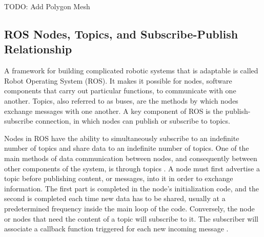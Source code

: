 TODO: Add Polygon Mesh

\subsection{ROS Nodes, Topics, and Subscribe-Publish Relationship}
A framework for building complicated robotic systems that is adaptable is called Robot Operating System (ROS). It makes it possible for nodes, software components that carry out particular functions, to communicate with one another. Topics, also referred to as buses, are the methods by which nodes exchange messages with one another. A key component of ROS is the publish-subscribe connection, in which nodes can publish or subscribe to topics.

Nodes in ROS have the ability to simultaneously subscribe to an indefinite number of topics and share data to an indefinite number of topics. One of the main methods of data communication between nodes, and consequently between other components of the system, is through topics \citep{St-Onge2022}. A node must first advertise a topic before publishing content, or messages, into it in order to exchange information. The first part is completed in the node's initialization code, and the second is completed each time new data has to be shared, usually at a predetermined frequency inside the main loop of the code. Conversely, the node or nodes that need the content of a topic will subscribe to it. The subscriber will associate a callback function triggered for each new incoming message \citep{St-Onge2022}.




